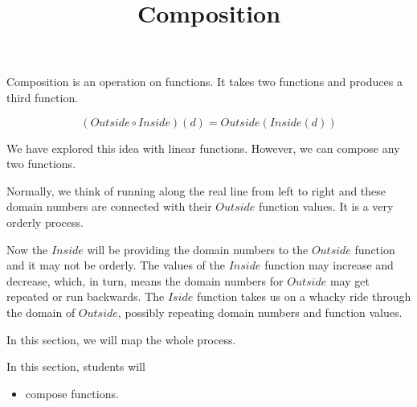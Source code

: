 \documentclass{ximera}
\title{Composition}
\begin{document}
\begin{abstract}
\end{abstract}
\maketitle













Composition is an operation on functions.  It takes two functions and produces a third function.


\[  (Outside \circ Inside)(d) = Outside(Inside(d))    \]



We have explored this idea with linear functions.  However, we can compose any two functions.






Normally, we think of running along the real line from left to right and these domain numbers are connected with their $Outside$ function values.  It is a very orderly process.

Now the $Inside$ will be providing the domain numbers to the $Outside$ function and it may not be orderly. The values of the $Inside$ function may increase and decrease, which, in turn, means the domain numbers for $Outside$ may get repeated or run backwards.   The $Iside$ function takes us on a whacky ride through the domain of $Outside$, possibly repeating domain numbers and function values.


In this section, we will map the whole process.
















\begin{sectionOutcomes}
In this section, students will 

\begin{itemize}
\item compose functions.
\end{itemize}
\end{sectionOutcomes}
\end{document}
